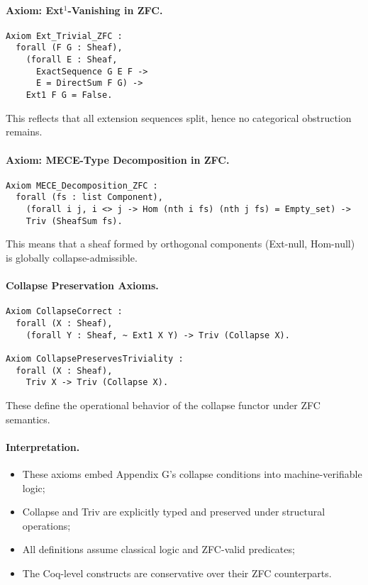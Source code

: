 \documentclass[11pt]{article}
\begin{document}
{\paragraph{Axiom: Ext$^1$-Vanishing in ZFC.}

\begin{lstlisting}[language=Coq]
Axiom Ext_Trivial_ZFC :
  forall (F G : Sheaf),
    (forall E : Sheaf,
      ExactSequence G E F ->
      E = DirectSum F G) ->
    Ext1 F G = False.
\end{lstlisting}

This reflects that all extension sequences split, hence no categorical obstruction remains.

\paragraph{Axiom: MECE-Type Decomposition in ZFC.}

\begin{lstlisting}[language=Coq]
Axiom MECE_Decomposition_ZFC :
  forall (fs : list Component),
    (forall i j, i <> j -> Hom (nth i fs) (nth j fs) = Empty_set) ->
    Triv (SheafSum fs).
\end{lstlisting}

This means that a sheaf formed by orthogonal components (Ext-null, Hom-null)  
is globally collapse-admissible.

\paragraph{Collapse Preservation Axioms.}

\begin{lstlisting}[language=Coq]
Axiom CollapseCorrect :
  forall (X : Sheaf),
    (forall Y : Sheaf, ~ Ext1 X Y) -> Triv (Collapse X).

Axiom CollapsePreservesTriviality :
  forall (X : Sheaf),
    Triv X -> Triv (Collapse X).
\end{lstlisting}

These define the operational behavior of the collapse functor under ZFC semantics.

\paragraph{Interpretation.}

\begin{itemize}
  \item These axioms embed Appendix G’s collapse conditions into machine-verifiable logic;
  \item Collapse and Triv are explicitly typed and preserved under structural operations;
  \item All definitions assume classical logic and ZFC-valid predicates;
  \item The Coq-level constructs are conservative over their ZFC counterparts.
\end{itemize}

}
\end{document}
